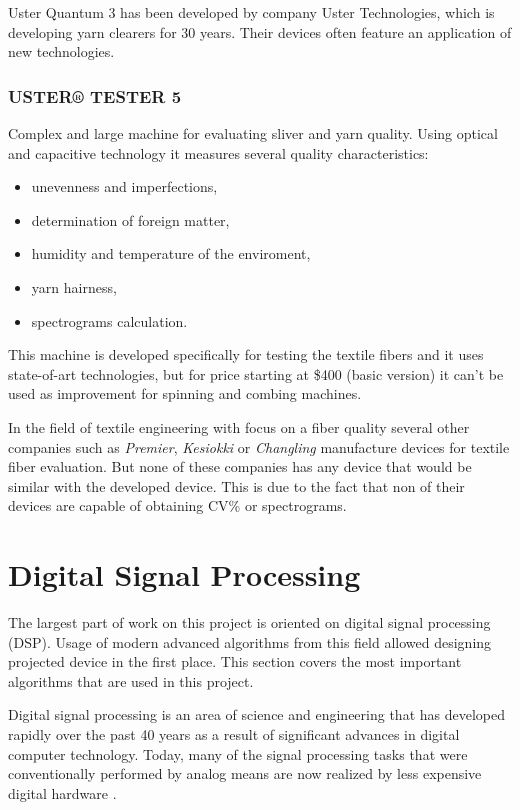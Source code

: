 \documentclass[twoside]{ctuthesis}
\theoremstyle{plain}
\theoremstyle{definition}
\theoremstyle{note}
\begin{document}
Uster Quantum 3 has been developed by company Uster Technologies, which is developing yarn clearers for 30 years. Their devices often feature an application of new technologies.

\subsubsection{USTER® TESTER 5}  
Complex and large machine for evaluating sliver and yarn quality. Using optical and capacitive technology it measures several quality characteristics:
\begin{itemize}
	\setlength{\itemsep}{5pt}
	\item unevenness and imperfections,
	\item determination of foreign matter,
	\item humidity and temperature of the enviroment,
	\item yarn hairness,
	\item spectrograms calculation.
\end{itemize}
This machine is developed specifically for testing the textile fibers and it uses state-of-art technologies, but for price starting at \$400 (basic version) it can't be used as improvement for spinning and combing machines.  
 
In the field of textile engineering with focus on a fiber quality several other companies such as \textit{Premier}, \textit{Kesiokki} or \textit{Changling} manufacture devices for textile fiber evaluation. But none of these companies has any device that would be similar with the developed device. This is due to the fact that non of their devices are capable of obtaining CV\% or spectrograms.

\section{Digital Signal Processing}
The largest part of work on this project is oriented on digital signal processing (DSP). Usage of modern advanced algorithms from this field allowed designing projected device in the first place. This section covers the most important algorithms that are used in this project.
	
	Digital signal processing is an area of science and engineering that has developed rapidly over the past 40 years as a result of significant advances in digital computer technology. Today, many of the signal processing tasks that were conventionally performed by analog means are now realized by less expensive digital hardware \cite{cite:2}.
	
\end{document}
